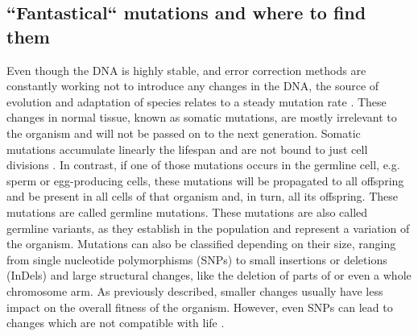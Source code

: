 \subsection[Mutations]{``Fantastical`` mutations and where to find them}
\label{intro-sec:mutations}
Even though the DNA is highly stable, and error correction methods are constantly working not to introduce any changes in the DNA, the source of evolution and adaptation of species relates to a steady mutation rate \cite{Darwin2010,Sprouffske2018}. These changes in normal tissue, known as somatic mutations, are mostly irrelevant to the organism and will not be passed on to the next generation. Somatic mutations accumulate linearly  the  lifespan and are not bound to just cell divisions \cite{Alexandrov2015,Moore2021,Cagan2022}. 
In contrast, if one of those mutations occurs in the germline cell, e.g. sperm or egg-producing cells, these mutations will be propagated to all offspring and be present in all cells of that organism and, in turn, all its offspring. These mutations are called germline mutations. These mutations are also called germline variants, as they establish in the population and represent a variation of the organism.
Mutations can also be classified depending on their size, ranging from single nucleotide polymorphisms (SNPs) to small insertions or deletions (InDels) and large structural changes, like the deletion of parts of or even a whole chromosome arm. As previously described, smaller changes usually have less impact on the overall fitness of the organism. However, even SNPs can lead to changes which are not compatible with life \cite{Shamseldin2015,Frey2021}.

